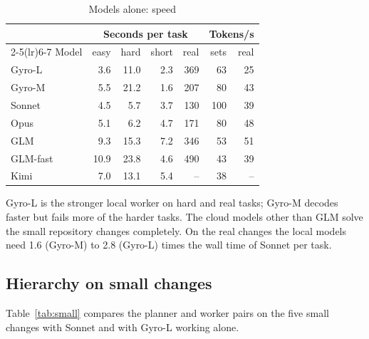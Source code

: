 \begin{table}[H]
\centering
\small
\caption{Models alone: speed}\label{tab:speed}
\begin{tabular}{lrrrrrr}
\toprule
 & \multicolumn{4}{c}{Seconds per task} & \multicolumn{2}{c}{Tokens/s} \\
\cmidrule(lr){2-5}\cmidrule(lr){6-7}
Model & easy & hard & short & real & sets & real \\
\midrule
Gyro-L & 3.6 & 11.0 & 2.3 & 369 & 63 & 25 \\
Gyro-M & 5.5 & 21.2 & 1.6 & 207 & 80 & 43 \\
Sonnet & 4.5 & 5.7 & 3.7 & 130 & 100 & 39 \\
Opus & 5.1 & 6.2 & 4.7 & 171 & 80 & 48 \\
GLM & 9.3 & 15.3 & 7.2 & 346 & 53 & 51 \\
GLM-fast & 10.9 & 23.8 & 4.6 & 490 & 43 & 39 \\
Kimi & 7.0 & 13.1 & 5.4 & -- & 38 & -- \\
\bottomrule
\end{tabular}
\par{}
\end{table}

Gyro-L is the stronger local worker on hard and real tasks; Gyro-M decodes faster but fails more of the harder
tasks. The cloud models other than GLM solve the small repository changes completely. On the real changes the
local models need 1.6 (Gyro-M) to 2.8 (Gyro-L) times the wall time of Sonnet per task.

\subsection{Hierarchy on small changes}

Table~\ref{tab:small} compares the planner and worker pairs on the five small changes with Sonnet and with
Gyro-L working alone.

